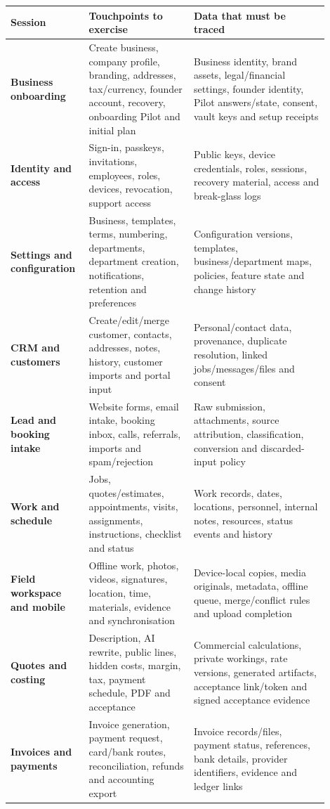 \documentclass[11pt]{article}
\begin{document}
\begin{longtable}{>{\raggedright\arraybackslash\bfseries}p{0.19\linewidth} p{0.31\linewidth} p{0.40\linewidth}}
\toprule
Session & Touchpoints to exercise & Data that must be traced \\
\midrule
\endhead
Business onboarding & Create business, company profile, branding, addresses, tax/currency, founder account, recovery, onboarding Pilot and initial plan & Business identity, brand assets, legal/financial settings, founder identity, Pilot answers/state, consent, vault keys and setup receipts \\
Identity and access & Sign-in, passkeys, invitations, employees, roles, devices, revocation, support access & Public keys, device credentials, roles, sessions, recovery material, access and break-glass logs \\
Settings and configuration & Business, templates, terms, numbering, departments, department creation, notifications, retention and preferences & Configuration versions, templates, business/department maps, policies, feature state and change history \\
CRM and customers & Create/edit/merge customer, contacts, addresses, notes, history, customer imports and portal input & Personal/contact data, provenance, duplicate resolution, linked jobs/messages/files and consent \\
Lead and booking intake & Website forms, email intake, booking inbox, calls, referrals, imports and spam/rejection & Raw submission, attachments, source attribution, classification, conversion and discarded-input policy \\
Work and schedule & Jobs, quotes/estimates, appointments, visits, assignments, instructions, checklist and status & Work records, dates, locations, personnel, internal notes, resources, status events and history \\
Field workspace and mobile & Offline work, photos, videos, signatures, location, time, materials, evidence and synchronisation & Device-local copies, media originals, metadata, offline queue, merge/conflict rules and upload completion \\
Quotes and costing & Description, AI rewrite, public lines, hidden costs, margin, tax, payment schedule, PDF and acceptance & Commercial calculations, private workings, rate versions, generated artifacts, acceptance link/token and signed acceptance evidence \\
Invoices and payments & Invoice generation, payment request, card/bank routes, reconciliation, refunds and accounting export & Invoice records/files, payment status, references, bank details, provider identifiers, evidence and ledger links \\

\end{longtable}
\end{document}
